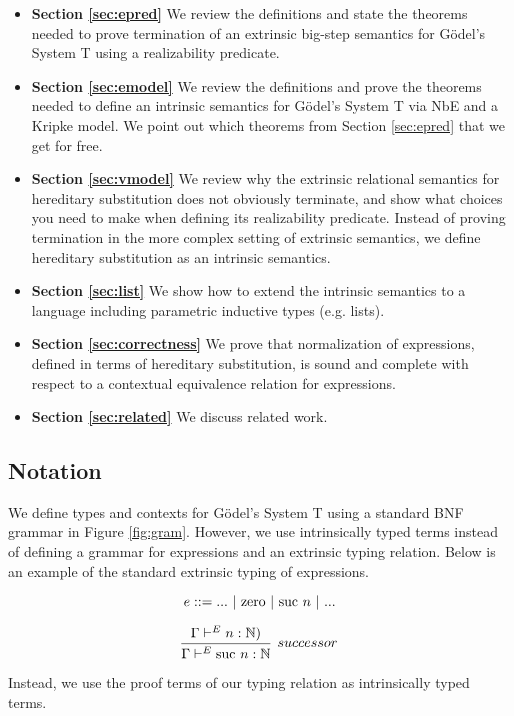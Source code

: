 \documentclass[preprint,nonatbib]{sigplanconf}
\numberwithin{mysubdfn}{mydfn}
\newcommand{\reffig}[1]{Figure \ref{fig:#1}}
\newcommand{\refsec}[1]{Section \ref{sec:#1}}
\def\nat{\mathbb{N}}
\newcommand{\con}[1]{\textmd{#1}}
\begin{document}
\begin{itemize}
\item{\bf{\refsec{epred}}}
We review the definitions and state the theorems needed to prove termination of
an extrinsic big-step semantics for G{\"o}del's System T using a
realizability predicate.

\item{\bf{\refsec{emodel}}}
We review the definitions and prove the theorems needed to define an
intrinsic semantics for G{\"o}del's System T via NbE and a Kripke
model. We point out which theorems from \refsec{epred} that we get for
free.

\item{\bf{\refsec{vmodel}}}
We review why the extrinsic relational semantics for hereditary
substitution does not obviously terminate, and show what choices you
need to make when defining its realizability predicate. Instead of
proving termination in the more complex setting of extrinsic
semantics, we define hereditary substitution as an intrinsic
semantics.

\item{\bf{\refsec{list}}}
We show how to extend the intrinsic semantics to a language including
parametric inductive types (e.g. lists).

\item{\bf{\refsec{correctness}}}
We prove that normalization of expressions, defined in terms of
hereditary substitution, is sound and complete with respect to a
contextual equivalence relation for expressions.

\item{\bf{\refsec{related}}}
We discuss related work.
\end{itemize}

\subsection{Notation}

We define types and contexts for G{\"o}del's System T using a standard
BNF grammar in \reffig{gram}. However, we use intrinsically typed
terms instead of defining a grammar for expressions and an extrinsic
typing relation. Below is an example of the standard extrinsic typing
of expressions.

$$
e ::= ... ~ | ~ \con{zero} ~ | ~ \con{suc} ~ n ~ | ~ ...
$$

$$
\infer
  [successor]
  {\Gamma \vdash^E \con{suc} ~ n : \nat}
{
  \Gamma \vdash^E n : \nat)
}
$$

Instead, we use the proof terms of our typing relation as
intrinsically typed terms.
\end{document}
